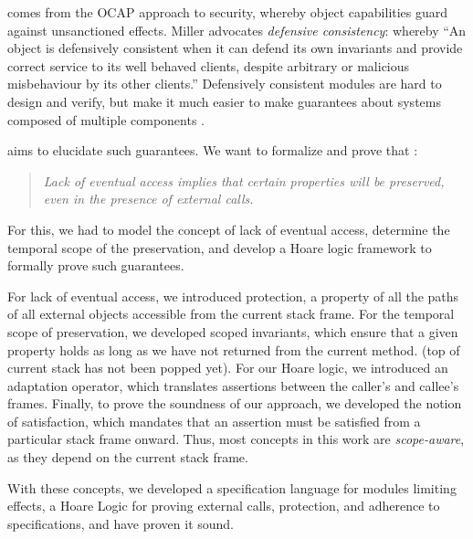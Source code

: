 
 
comes from the OCAP approach to security, whereby object capabilities guard against unsanctioned effects.
Miller \cite{miller-esop2013,MillerPhD} advocates
 \emph{defensive consistency}: whereby %
 {``An object is defensively
  consistent when it can defend its own invariants and provide correct
  service to its well behaved clients, despite arbitrary or malicious
  misbehaviour by its other clients.''}  Defensively consistent
modules  are  hard to design %
 and  verify, but
make it much
easier to make guarantees about systems composed of multiple components
\cite{Murray10dphil}.

  aims to elucidate such guarantees. We want to formalize and prove  that 
\cite{permissionAuthority}:
\begin{quote}
\emph{Lack of eventual access implies that certain properties will be preserved, even in the presence of external calls.}
\end{quote}
For this, we had  to  model the concept of  lack of eventual access,  determine the temporal scope of the preservation, and  develop a Hoare logic framework to formally prove such guarantees.

For lack of eventual access,  we introduced protection, %
a property of all  the paths of all external objects accessible from the current stack frame.
For the  temporal scope of preservation, we developed scoped invariants, which ensure that a given property holds as long as we have not returned from the current method.
  (top of current stack has not been popped yet). 
 For our Hoare logic, we introduced an adaptation operator, which translates assertions between the caller’s and callee’s frames. 
 Finally, to prove the soundness of our approach, we developed the notion of \strong satisfaction,  which mandates that an assertion must be satisfied from a particular stack frame onward. 
 Thus, most concepts in this work are  \emph{scope-aware}, as they depend  on the current stack frame.
 
 With these concepts, we %
 developed a specification language for modules limiting effects, a Hoare Logic for proving external calls, protection, and adherence to specifications, and have proven it sound. %


